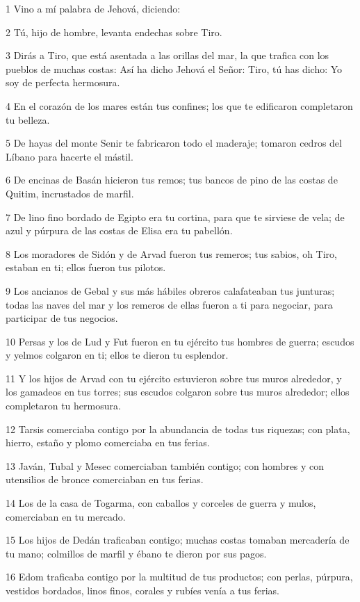 \par 1 Vino a mí palabra de Jehová, diciendo:
\par 2 Tú, hijo de hombre, levanta endechas sobre Tiro.
\par 3 Dirás a Tiro, que está asentada a las orillas del mar, la que trafica con los pueblos de muchas costas: Así ha dicho Jehová el Señor: Tiro, tú has dicho: Yo soy de perfecta hermosura.
\par 4 En el corazón de los mares están tus confines; los que te edificaron completaron tu belleza.
\par 5 De hayas del monte Senir te fabricaron todo el maderaje; tomaron cedros del Líbano para hacerte el mástil.
\par 6 De encinas de Basán hicieron tus remos; tus bancos de pino de las costas de Quitim, incrustados de marfil.
\par 7 De lino fino bordado de Egipto era tu cortina, para que te sirviese de vela; de azul y púrpura de las costas de Elisa era tu pabellón.
\par 8 Los moradores de Sidón y de Arvad fueron tus remeros; tus sabios, oh Tiro, estaban en ti; ellos fueron tus pilotos.
\par 9 Los ancianos de Gebal y sus más hábiles obreros calafateaban tus junturas; todas las naves del mar y los remeros de ellas fueron a ti para negociar, para participar de tus negocios.
\par 10 Persas y los de Lud y Fut fueron en tu ejército tus hombres de guerra; escudos y yelmos colgaron en ti; ellos te dieron tu esplendor.
\par 11 Y los hijos de Arvad con tu ejército estuvieron sobre tus muros alrededor, y los gamadeos en tus torres; sus escudos colgaron sobre tus muros alrededor; ellos completaron tu hermosura.
\par 12 Tarsis comerciaba contigo por la abundancia de todas tus riquezas; con plata, hierro, estaño y plomo comerciaba en tus ferias.
\par 13 Javán, Tubal y Mesec comerciaban también contigo; con hombres y con utensilios de bronce comerciaban en tus ferias.
\par 14 Los de la casa de Togarma, con caballos y corceles de guerra y mulos, comerciaban en tu mercado.
\par 15 Los hijos de Dedán traficaban contigo; muchas costas tomaban mercadería de tu mano; colmillos de marfil y ébano te dieron por sus pagos.
\par 16 Edom traficaba contigo por la multitud de tus productos; con perlas, púrpura, vestidos bordados, linos finos, corales y rubíes venía a tus ferias.
